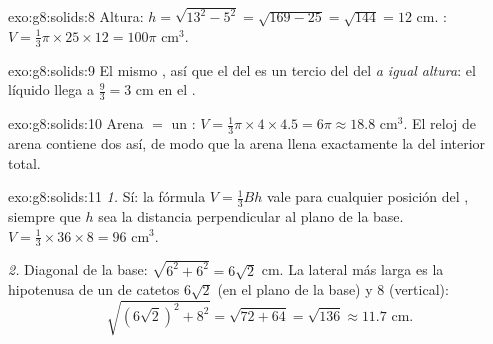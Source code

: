 \begin{solution}{exo:g8:solids:8}
Altura: $h = \sqrt{13^2 - 5^2} = \sqrt{169 - 25} = \sqrt{144} = 12$
cm. : $V = \frac13 \pi \times 25 \times 12 = 100\pi$ cm$^3$.
\end{solution}

\begin{solution}{exo:g8:solids:9}
El mismo , así que el  del  es un tercio del 
del  \emph{a igual altura}: el líquido llega a
$\frac{9}{3} = 3$ cm en el .
\end{solution}

\begin{solution}{exo:g8:solids:10}
Arena $=$ un : $V = \frac13 \pi \times 4 \times 4.5 = 6\pi
\approx 18.8$ cm$^3$. El reloj de arena contiene dos  así, de modo que la
arena llena exactamente la  del  interior total.
\end{solution}

\begin{solution}{exo:g8:solids:11}
\emph{1.} Sí: la fórmula $V = \frac13 Bh$ vale para cualquier posición del
, siempre que $h$ sea la distancia perpendicular al plano de la
base. $V = \frac13 \times 36 \times 8 = 96$ cm$^3$.

\emph{2.} Diagonal de la base: $\sqrt{6^2 + 6^2} = 6\sqrt2$ cm. La 
lateral más larga es la hipotenusa de un  de catetos
$6\sqrt2$ (en el plano de la base) y $8$ (vertical):
\[
\sqrt{(6\sqrt2)^2 + 8^2} = \sqrt{72 + 64} = \sqrt{136} \approx 11.7
\text{ cm}.
\]
\end{solution}

